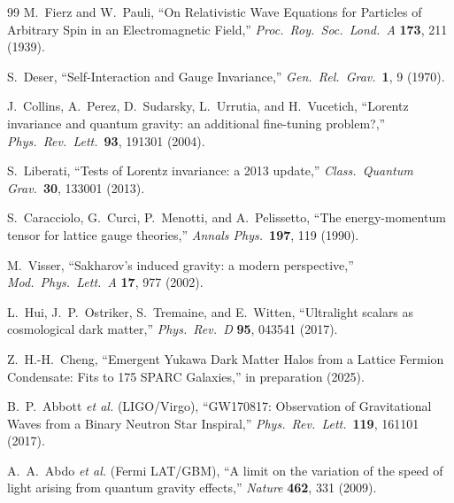 \documentclass[11pt,a4paper]{article}
\begin{document}
\begin{thebibliography}{99}
M.~Fierz and W.~Pauli,
``On Relativistic Wave Equations for Particles of Arbitrary Spin
in an Electromagnetic Field,''
\textit{Proc.\ Roy.\ Soc.\ Lond.\ A} \textbf{173}, 211 (1939).

S.~Deser,
``Self-Interaction and Gauge Invariance,''
\textit{Gen.\ Rel.\ Grav.}\ \textbf{1}, 9 (1970).

J.~Collins, A.~Perez, D.~Sudarsky, L.~Urrutia, and H.~Vucetich,
``Lorentz invariance and quantum gravity: an additional
fine-tuning problem?,''
\textit{Phys.\ Rev.\ Lett.}\ \textbf{93}, 191301 (2004).

S.~Liberati,
``Tests of Lorentz invariance: a 2013 update,''
\textit{Class.\ Quantum Grav.}\ \textbf{30}, 133001 (2013).

S.~Caracciolo, G.~Curci, P.~Menotti, and A.~Pelissetto,
``The energy-momentum tensor for lattice gauge theories,''
\textit{Annals Phys.}\ \textbf{197}, 119 (1990).

M.~Visser,
``Sakharov's induced gravity: a modern perspective,''
\textit{Mod.\ Phys.\ Lett.\ A} \textbf{17}, 977 (2002).

L.~Hui, J.~P.~Ostriker, S.~Tremaine, and E.~Witten,
``Ultralight scalars as cosmological dark matter,''
\textit{Phys.\ Rev.\ D} \textbf{95}, 043541 (2017).

Z.~H.-H.~Cheng,
``Emergent Yukawa Dark Matter Halos from a Lattice Fermion
Condensate: Fits to 175 SPARC Galaxies,''
in preparation (2025).

B.~P.~Abbott \textit{et al.} (LIGO/Virgo),
``GW170817: Observation of Gravitational Waves from a Binary
Neutron Star Inspiral,''
\textit{Phys.\ Rev.\ Lett.}\ \textbf{119}, 161101 (2017).

A.~A.~Abdo \textit{et al.} (Fermi LAT/GBM),
``A limit on the variation of the speed of light arising from
quantum gravity effects,''
\textit{Nature} \textbf{462}, 331 (2009).

\end{thebibliography}
\end{document}
